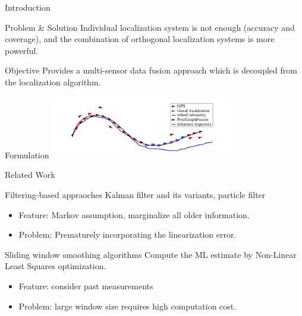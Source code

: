 \documentclass[10pt]{beamer}
\begin{document}
	\begin{frame}{Introduction}
		\begin{block}{Problem \& Solution}
			Individual localization system is not enough (accuracy and coverage), and the combination of orthogonal localization systems is more powerful.
		\end{block}
		\begin{block}{Objective}
			Provides a multi-sensor data fusion approach which is decoupled from the localization algorithm.
		\end{block}
		\begin{block}{Formulation}
			\centering
			\includegraphics[width=8cm]{./img/posefusion.png}
		\end{block}
	\end{frame}
	
	\begin{frame}{Related Work}
		\begin{block}{Filtering-based appraoches}
			Kalman filter and its variants, particle filter
			\begin{itemize}
				\item Feature: Markov assumption, marginalize all older information.
				\item Problem: Prematurely incorporating the linearization error.
			\end{itemize}
		\end{block}
		\begin{block}{Sliding window smoothing algorithms}
			Compute the ML estimate by Non-Linear Least Squares optimization.
			\begin{itemize}
				\item Feature: consider past measurements
				\item Problem: large window size requires high computation cost.
			\end{itemize}
		\end{block}
	\end{frame}
\end{document}
